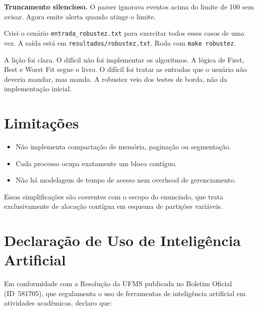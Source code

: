 \documentclass[12pt]{article}
\begin{document}
\textbf{Truncamento silencioso.} O parser ignorava eventos acima do limite de 100 sem avisar. Agora emite alerta quando atinge o limite.

Criei o cenário \texttt{entrada\_robustez.txt} para exercitar todos esses casos de uma vez. A saída está em \texttt{resultados/robustez.txt}. Roda com \texttt{make robustez}.

A lição foi clara. O difícil não foi implementar os algoritmos. A lógica de First, Best e Worst Fit segue o livro. O difícil foi tratar as entradas que o usuário não deveria mandar, mas manda. A robustez veio dos testes de borda, não da implementação inicial.

\section{Limitações}

\begin{itemize}
    \item Não implementa compactação de memória, paginação ou segmentação.
    \item Cada processo ocupa exatamente um bloco contíguo.
    \item Não há modelagem de tempo de acesso nem overhead de gerenciamento.
\end{itemize}

Essas simplificações são coerentes com o escopo do enunciado, que trata exclusivamente de alocação contígua em esquema de partições variáveis.

\section{Declaração de Uso de Inteligência Artificial}

Em conformidade com a Resolução da UFMS publicada no Boletim Oficial (ID~581705), que regulamenta o uso de ferramentas de inteligência artificial em atividades acadêmicas, declaro que:
\end{document}
